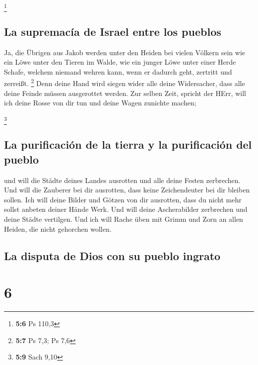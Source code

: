 \footnote{\textbf{5:6} Ps 110,3}

\hypertarget{la-supremacuxeda-de-israel-entre-los-pueblos}{%
\subsection{La supremacía de Israel entre los
pueblos}\label{la-supremacuxeda-de-israel-entre-los-pueblos}}

 Ja, die Übrigen aus Jakob werden unter den Heiden bei
vielen Völkern sein wie ein Löwe unter den Tieren im Walde, wie ein
junger Löwe unter einer Herde Schafe, welchem niemand wehren kann, wenn
er dadurch geht, zertritt und zerreißt. \footnote{\textbf{5:7} Ps 7,3;
  Ps 7,6}  Denn deine Hand wird siegen wider alle deine
Widersacher, dass alle deine Feinde müssen ausgerottet werden.
 Zur selben Zeit, spricht der HErr, will ich deine Rosse
von dir tun und deine Wagen zunichte machen;

\footnote{\textbf{5:9} Sach 9,10}

\hypertarget{la-purificaciuxf3n-de-la-tierra-y-la-purificaciuxf3n-del-pueblo}{%
\subsection{La purificación de la tierra y la purificación del
pueblo}\label{la-purificaciuxf3n-de-la-tierra-y-la-purificaciuxf3n-del-pueblo}}

 und will die Städte deines Landes ausrotten und alle
deine Festen zerbrechen.  Und will die Zauberer bei dir
ausrotten, dass keine Zeichendeuter bei dir bleiben sollen.
 Ich will deine Bilder und Götzen von dir ausrotten, dass
du nicht mehr sollst anbeten deiner Hände Werk.  Und will
deine Ascherabilder zerbrechen und deine Städte vertilgen.
 Und ich will Rache üben mit Grimm und Zorn an allen
Heiden, die nicht gehorchen wollen.

\hypertarget{la-disputa-de-dios-con-su-pueblo-ingrato}{%
\subsection{La disputa de Dios con su pueblo
ingrato}\label{la-disputa-de-dios-con-su-pueblo-ingrato}}

\hypertarget{section-5}{%
\section{6}\label{section-5}}

